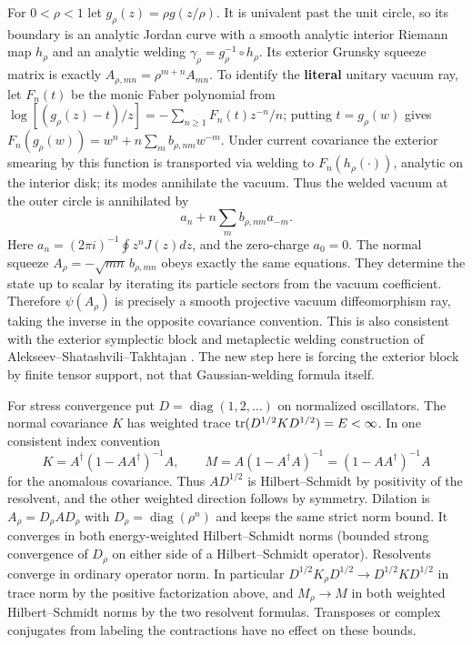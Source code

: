 \documentclass[11pt]{article}
\begin{document}
For \(0<\rho<1\) let \(g_\rho(z)=\rho g(z/\rho)\). It is univalent past the unit circle, so its boundary is an analytic Jordan curve with a smooth analytic interior Riemann map \(h_\rho\) and an analytic welding \(\gamma_\rho=g_\rho^{-1}\circ h_\rho\). Its exterior Grunsky squeeze matrix is exactly \(A_{\rho,mn}=\rho^{m+n}A_{mn}\). To identify the \textbf{literal} unitary vacuum ray, let \(F_n(t)\) be the monic Faber polynomial from \(\log[(g_\rho(z)-t)/z]=-\sum_{n\ge1}F_n(t)z^{-n}/n\); putting \(t=g_\rho(w)\) gives \(F_n(g_\rho(w))=w^n+n\sum_m b_{\rho,nm}w^{-m}\). Under current covariance the exterior smearing by this function is transported via welding to \(F_n(h_\rho(\cdot))\), analytic on the interior disk; its modes annihilate the vacuum. Thus the welded vacuum at the outer circle is annihilated by \[
                  a_n+n\sum_m b_{\rho,nm}a_{-m}.
\] Here \(a_n=(2\pi i)^{-1}\oint z^n J(z)dz\), and the zero-charge \(a_0=0\). The normal squeeze \(A_\rho=-\sqrt{mn}\,b_{\rho,mn}\) obeys exactly the same equations. They determine the state up to scalar by iterating its particle sectors from the vacuum coefficient. Therefore \(\psi(A_\rho)\) is precisely a smooth projective vacuum diffeomorphism ray, taking the inverse in the opposite covariance convention. This is also consistent with the exterior symplectic block and metaplectic welding construction of Alekseev--Shatashvili--Takhtajan \cite[Proposition 3.3, equation (30), Theorem 5.5]{welding}. The new step here is forcing the exterior block by finite tensor support, not that Gaussian-welding formula itself.

For stress convergence put \(D=\operatorname{diag}(1,2,\ldots)\) on normalized oscillators. The normal covariance \(K\) has weighted trace \({\rm tr}(D^{1/2}KD^{1/2})=E<\infty\). In one consistent index convention \[
 K=A^\dagger(1-AA^\dagger)^{-1}A,\qquad
 M=A(1-A^\dagger A)^{-1}=(1-AA^\dagger)^{-1}A
\] for the anomalous covariance. Thus \(AD^{1/2}\) is Hilbert--Schmidt by positivity of the resolvent, and the other weighted direction follows by symmetry. Dilation is \(A_\rho=D_\rho A D_\rho\) with \(D_\rho=\operatorname{diag}(\rho^n)\) and keeps the same strict norm bound. It converges in both energy-weighted Hilbert--Schmidt norms (bounded strong convergence of \(D_\rho\) on either side of a Hilbert--Schmidt operator). Resolvents converge in ordinary operator norm. In particular \(D^{1/2}K_\rho D^{1/2}\to D^{1/2}KD^{1/2}\) in trace norm by the positive factorization above, and \(M_\rho\to M\) in both weighted Hilbert--Schmidt norms by the two resolvent formulas. Transposes or complex conjugates from labeling the contractions have no effect on these bounds.
\end{document}
